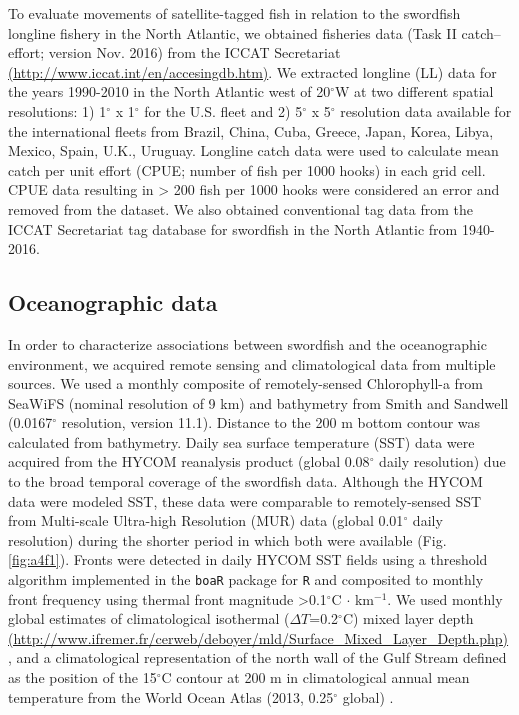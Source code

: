 To evaluate movements of satellite-tagged fish in relation to the swordfish longline fishery in the North Atlantic, we obtained fisheries data (Task II catch--effort; version Nov. 2016) from the ICCAT Secretariat \href{http://www.iccat.int/en/accesingdb.htm}{(http://www.iccat.int/en/accesingdb.htm)}. We extracted longline (LL) data for the years 1990-2010 in the North Atlantic west of 20$^{\circ}$W at two different spatial resolutions: 1) 1$^{\circ}$ x 1$^{\circ}$ for the U.S. fleet and 2) 5$^{\circ}$ x 5$^{\circ}$ resolution data available for the international fleets from Brazil, China, Cuba, Greece, Japan, Korea, Libya, Mexico, Spain, U.K., Uruguay. Longline catch data were used to calculate mean catch per unit effort (CPUE; number of fish per 1000 hooks) in each grid cell. CPUE data resulting in > 200 fish per 1000 hooks were considered an error and removed from the dataset. We also obtained conventional tag data from the ICCAT Secretariat tag database for swordfish in the North Atlantic from 1940-2016.

\subsection{Oceanographic data}

In order to characterize associations between swordfish and the
oceanographic environment, we acquired remote sensing and climatological data from multiple sources. We used a monthly composite of remotely-sensed Chlorophyll-a from SeaWiFS (nominal resolution of 9 km) and bathymetry from Smith and Sandwell (0.0167$^{\circ}$ resolution, version 11.1). Distance to the 200 m bottom contour was calculated from bathymetry. Daily sea surface temperature (SST) data were acquired from the HYCOM reanalysis product (global 0.08$^{\circ}$ daily resolution) due to the broad temporal coverage of the swordfish data. Although the HYCOM data were modeled SST, these data were comparable to remotely-sensed SST from Multi-scale Ultra-high Resolution (MUR) data (global 0.01$^{\circ}$ daily resolution) during the shorter period in which both were available (Fig. \cref{fig:a4f1}). Fronts were detected in daily HYCOM SST fields using a threshold algorithm \citep{Belkin2009} implemented in the \texttt{boaR} package \citep{Galuardi2017} for \texttt{R} and composited to monthly front frequency using thermal front magnitude >0.1$^{\circ}$C $\cdot$ km$^{-1}$. We used monthly global estimates of climatological isothermal ($\Delta T$=0.2$^{\circ}$C) mixed layer depth \href{http://www.ifremer.fr/cerweb/deboyer/mld/Surface_Mixed_Layer_Depth.php}{(http://www.ifremer.fr/cerweb/deboyer/mld/Surface\_Mixed\_Layer\_Depth.php)} \citep{DeBoyerMontegut2004}, and a climatological representation of the north wall of the Gulf Stream defined as the position of the 15$^{\circ}$C contour at 200 m in climatological annual mean temperature from the World Ocean Atlas (2013, 0.25$^{\circ}$ global) \citep{Fuglister1963, Gaube2017DSR}.

